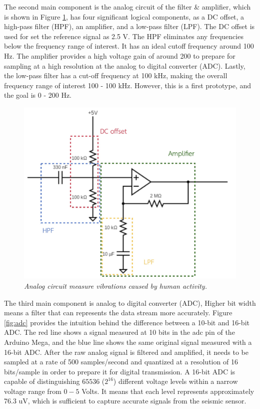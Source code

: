 The second main component is the analog circuit of the filter \& amplifier, which is shown in Figure \ref{fig:analog_circuit}, has four significant logical components, as a DC offset, a high-pass filter (HPF), an amplifier, and a low-pass filter (LPF). The DC offset is used for set the reference signal as 2.5 V. The HPF eliminates any frequencies below the frequency range of interest. It has an ideal cutoff frequency around 100 Hz. The amplifier provides a high voltage gain of around 200 to prepare for sampling at a high resolution at the analog to digital converter (ADC). Lastly, the low-pass filter has a cut-off frequency at 100 kHz, making the overall frequency range of interest 100 - 100 kHz. However, this is a first prototype, and the goal is 0 - 200 Hz.

\begin{figure}[H]
  \centering
  \caption[Analog circuit measure vibrations caused by human activity.]{\emph{Analog circuit measure vibrations caused by human activity.}}\label{fig:analog_circuit}
  \includegraphics[scale = 0.2]{figures/analogcircuit.jpg}
\end{figure}


The third main component is analog to digital converter (ADC), Higher bit width means a filter that can represents the data stream more accurately. Figure \ref{fig:adc} provides the intuition behind the difference between a 10-bit and 16-bit ADC.  The red line shows a signal measured at 10 bits in the adc pin of the Arduino Mega, and the blue line shows the same original signal measured with a 16-bit ADC. After the raw analog signal is filtered and amplified, it needs to be sampled at a rate of 500 samples/second and quantized at a resolution of 16 bits/sample in order to prepare it for digital transmission. A 16-bit ADC is capable of distinguishing $65536$ ($2^{16}$) different voltage levels within a narrow voltage range from $0 - 5$ Volts. It means that each level represents approximately 76.3 uV, which is sufficient to capture accurate signals from the seismic sensor.

